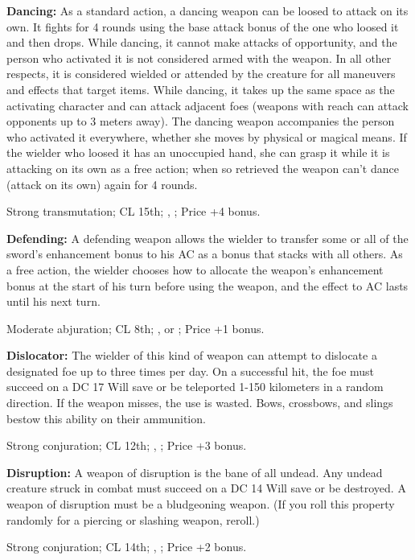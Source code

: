 \textbf{Dancing:} As a standard action, a dancing weapon can be loosed to attack on its own. It fights for 4 rounds using the base attack bonus of the one who loosed it and then drops. While dancing, it cannot make attacks of opportunity, and the person who activated it is not considered armed with the weapon. In all other respects, it is considered wielded or attended by the creature for all maneuvers and effects that target items. While dancing, it takes up the same space as the activating character and can attack adjacent foes (weapons with reach can attack opponents up to 3 meters away). The dancing weapon accompanies the person who activated it everywhere, whether she moves by physical or magical means. If the wielder who loosed it has an unoccupied hand, she can grasp it while it is attacking on its own as a free action; when so retrieved the weapon can't dance (attack on its own) again for 4 rounds.

Strong transmutation; CL 15th; , ; Price +4 bonus.

\textbf{Defending:} A defending weapon allows the wielder to transfer some or all of the sword's enhancement bonus to his AC as a bonus that stacks with all others. As a free action, the wielder chooses how to allocate the weapon's enhancement bonus at the start of his turn before using the weapon, and the effect to AC lasts until his next turn.

Moderate abjuration; CL 8th; ,  or ; Price +1 bonus.

\textbf{Dislocator:} The wielder of this kind of weapon can attempt to dislocate a designated foe up to three times per day. On a successful hit, the foe must succeed on a DC 17 Will save or be teleported 1-150 kilometers in a random direction. If the weapon misses, the use is wasted. Bows, crossbows, and slings bestow this ability on their ammunition.

Strong conjuration; CL 12th; , ; Price +3 bonus.

\textbf{Disruption:} A weapon of disruption is the bane of all undead. Any undead creature struck in combat must succeed on a DC 14 Will save or be destroyed. A weapon of disruption must be a bludgeoning weapon. (If you roll this property randomly for a piercing or slashing weapon, reroll.)

Strong conjuration; CL 14th; , ; Price +2 bonus.

